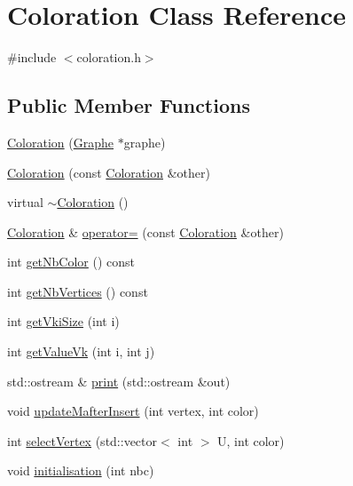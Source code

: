 \hypertarget{classColoration}{\section{Coloration Class Reference}
\label{classColoration}
}


{\ttfamily \#include $<$coloration.\-h$>$}

\subsection*{Public Member Functions}
\begin{DoxyCompactItemize}
\item 
\hyperlink{classColoration_a77f5ff52a790fcf817e52fb8f4b646a9}{Coloration} (\hyperlink{classGraphe}{Graphe} $\ast$graphe)
\item 
\hyperlink{classColoration_a5181f6ad3f6d63c1ad52ff5ee9353228}{Coloration} (const \hyperlink{classColoration}{Coloration} \&other)
\item 
virtual \hyperlink{classColoration_af31df0a1038ff229151acd4d88fe2da1}{$\sim$\-Coloration} ()
\item 
\hyperlink{classColoration}{Coloration} \& \hyperlink{classColoration_a27730d1fd674f4304e2b3ad8f069367e}{operator=} (const \hyperlink{classColoration}{Coloration} \&other)
\item 
int \hyperlink{classColoration_afd52a7165d471c2e34bcbea98c13eef1}{get\-Nb\-Color} () const 
\item 
int \hyperlink{classColoration_aa1ef4477dfb3c797afc38486f592fce6}{get\-Nb\-Vertices} () const 
\item 
int \hyperlink{classColoration_acc611eeebd104505c79928fef8099da6}{get\-Vki\-Size} (int i)
\item 
int \hyperlink{classColoration_a9b43769d5ae5c6d4102ad0a0932d51f6}{get\-Value\-Vk} (int i, int j)
\item 
std\-::ostream \& \hyperlink{classColoration_aff862370d4c765890a609d1abc045cb3}{print} (std\-::ostream \&out)
\item 
void \hyperlink{classColoration_abefa1ff9f574a2648c14f4bb4759da11}{update\-Mafter\-Insert} (int vertex, int color)
\item 
int \hyperlink{classColoration_a64305d2935816865c273344771f117a3}{select\-Vertex} (std\-::vector$<$ int $>$ U, int color)
\item 
void \hyperlink{classColoration_ab8b4ea99e7474a2dca053fa711340dc1}{initialisation} (int nbc)
\item 

\end{DoxyCompactItemize}

